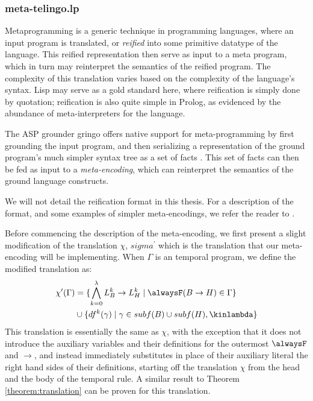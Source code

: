 \subsubsection{meta-telingo.lp}

Metaprogramming is a generic technique in programming languages, where
an input program is translated, or \emph{reified} into some primitive
datatype of the language. This reified representation then serve as
input to a meta program, which in turn may reinterpret the semantics
of the reified program. The complexity of this translation varies
based on the complexity of the language's syntax. Lisp may serve as a
gold standard here, where reification is simply done by quotation;
reification is also quite simple in Prolog, as evidenced by the
abundance of meta-interpreters for the language. 

The ASP grounder gringo offers native support for meta-programming by
first grounding the input program, and then serializing a
representation of the ground program's much simpler syntax tree as a
set of facts \cite{karoscwa21a}. This set of facts can then be fed as
input to a \emph{meta-encoding}, which can reinterpret the semantics
of the ground language constructs.

We will not detail the reification format in this thesis. For a
description of the format, and some examples of simpler
meta-encodings, we refer the reader to \cite{karoscwa21a}.

Before commencing the description of the meta-encoding, we first
present a slight modification of the translation $\chi$,
$sigma^{\prime}$ which is the translation that our meta-encoding will
be implementing. When $\Gamma$ is an temporal program, we define the modified
translation as:
\begin{align*}
\chi^{\prime}(\Gamma) & = \{ \bigwedge_{k=0}^{\lambda} L_B^k
\rightarrow L_H^k \mid \alwaysF(B \rightarrow H) \in \Gamma \} \\
& \cup \{ df^k(\gamma) \mid \gamma \in subf(B) \cup subf(H), \kinlambda \}
\end{align*}
This translation is essentially the same as $\chi$, with the
exception that it does not introduce the auxiliary variables and their
definitions for the outermost $\alwaysF$ and $\rightarrow$, and
instead immediately substitutes in place of their auxiliary literal
the right hand sides of their definitions, starting off the
translation $\chi$ from the head and the body of the temporal rule. A similar
result to Theorem \ref{theorem:translation} can be proven for this
translation.

